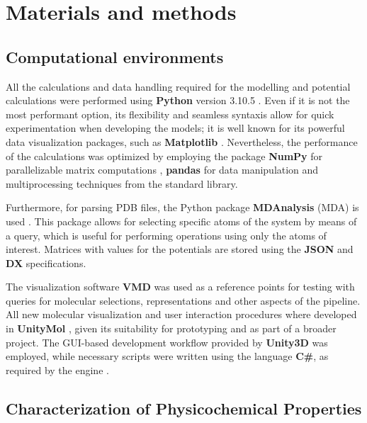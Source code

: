 \chapter{Materials and methods} %

\section{Computational environments}
  All the calculations and data handling required for the modelling and potential calculations were performed using \textbf{Python} version 3.10.5 \cite{python_2009}. Even if it is not the most performant option, its flexibility and seamless syntaxis allow for quick experimentation when developing the models; it is well known for its powerful data visualization packages, such as \textbf{Matplotlib} \cite{python_2021}. Nevertheless, the performance of the calculations was optimized by employing the package \textbf{NumPy} for parallelizable matrix computations \cite{numpy_2020}, \textbf{pandas} for data manipulation \cite{pandas_2020} and multiprocessing techniques from the standard library.

  Furthermore, for parsing PDB files, the Python package \textbf{MDAnalysis} (MDA) is used \cite{mda_2016, mda_2011}. This package allows for selecting specific atoms of the system by means of a query, which is useful for performing operations using only the atoms of interest. Matrices with values for the potentials are stored using the \textbf{JSON} \cite{json_web} and \textbf{DX} \cite{opendx_web} specifications.

  The visualization software \textbf{VMD} \cite{vmd_96} was used as a reference points for testing with queries for molecular selections, representations and other aspects of the pipeline. All new molecular visualization and user interaction procedures where developed in \textbf{UnityMol} \cite{unitymol_web}, given its suitability for prototyping and as part of a broader project. The GUI-based development workflow provided by \textbf{Unity3D} was employed, while necessary scripts were written using the language \textbf{C\#}, as required by the engine \cite{unity_2014}.


\section{Characterization of Physicochemical Properties}

